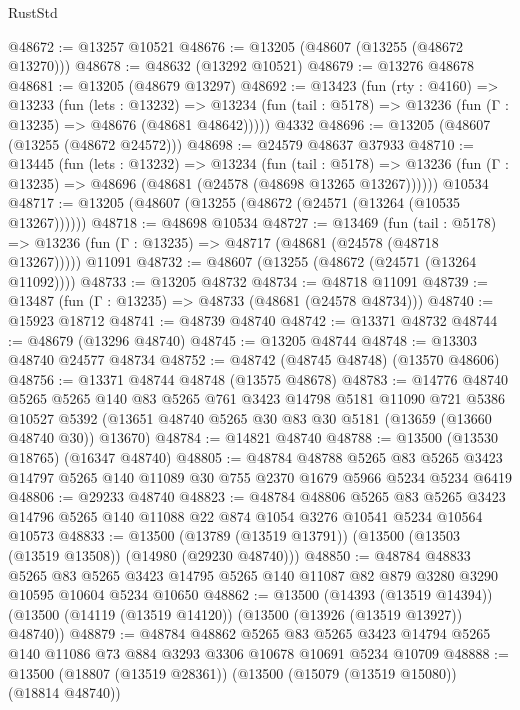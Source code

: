 \begin{lexlean}{RustStd}
\begin{coremodule}
@48672 := @13257 @10521
@48676 := @13205 (@48607 (@13255 (@48672 @13270)))
@48678 := @48632 (@13292 @10521)
@48679 := @13276 @48678
@48681 := @13205 (@48679 @13297)
@48692 := @13423
    (fun (rty : @4160) =>
    @13233
      (fun (lets : @13232) =>
      @13234 (fun (tail : @5178) => @13236 (fun (Γ : @13235) => @48676 (@48681 @48642)))))
    @4332
@48696 := @13205 (@48607 (@13255 (@48672 @24572)))
@48698 := @24579 @48637 @37933
@48710 := @13445
    (fun (lets : @13232) =>
    @13234
      (fun (tail : @5178) =>
      @13236 (fun (Γ : @13235) => @48696 (@48681 (@24578 (@48698 @13265 @13267))))))
    @10534
@48717 := @13205 (@48607 (@13255 (@48672 (@24571 (@13264 (@10535 @13267))))))
@48718 := @48698 @10534
@48727 := @13469
    (fun (tail : @5178) => @13236 (fun (Γ : @13235) => @48717 (@48681 (@24578 (@48718 @13267)))))
    @11091
@48732 := @48607 (@13255 (@48672 (@24571 (@13264 @11092))))
@48733 := @13205 @48732
@48734 := @48718 @11091
@48739 := @13487 (fun (Γ : @13235) => @48733 (@48681 (@24578 @48734)))
@48740 := @15923 @18712
@48741 := @48739 @48740
@48742 := @13371 @48732
@48744 := @48679 (@13296 @48740)
@48745 := @13205 @48744
@48748 := @13303 @48740 @24577 @48734
@48752 := @48742 (@48745 @48748) (@13570 @48606)
@48756 := @13371 @48744 @48748 (@13575 @48678)
@48783 := @14776
    @48740
    @5265
    @5265
    @140
    @83
    @5265
    @761
    @3423
    @14798
    @5181
    @11090
    @721
    @5386
    @10527
    @5392
    (@13651 @48740 @5265 @30 @83 @30 @5181 (@13659 (@13660 @48740 @30)) @13670)
@48784 := @14821 @48740
@48788 := @13500 (@13530 @18765) (@16347 @48740)
@48805 := @48784
    @48788
    @5265
    @83
    @5265
    @3423
    @14797
    @5265
    @140
    @11089
    @30
    @755
    @2370
    @1679
    @5966
    @5234
    @5234
    @6419
@48806 := @29233 @48740
@48823 := @48784
    @48806
    @5265
    @83
    @5265
    @3423
    @14796
    @5265
    @140
    @11088
    @22
    @874
    @1054
    @3276
    @10541
    @5234
    @10564
    @10573
@48833 := @13500 (@13789 (@13519 @13791)) (@13500 (@13503 (@13519 @13508)) (@14980 (@29230 @48740)))
@48850 := @48784
    @48833
    @5265
    @83
    @5265
    @3423
    @14795
    @5265
    @140
    @11087
    @82
    @879
    @3280
    @3290
    @10595
    @10604
    @5234
    @10650
@48862 := @13500
    (@14393 (@13519 @14394))
    (@13500 (@14119 (@13519 @14120)) (@13500 (@13926 (@13519 @13927)) @48740))
@48879 := @48784
    @48862
    @5265
    @83
    @5265
    @3423
    @14794
    @5265
    @140
    @11086
    @73
    @884
    @3293
    @3306
    @10678
    @10691
    @5234
    @10709
@48888 := @13500 (@18807 (@13519 @28361)) (@13500 (@15079 (@13519 @15080)) (@18814 @48740))

\end{coremodule}
\end{lexlean}

